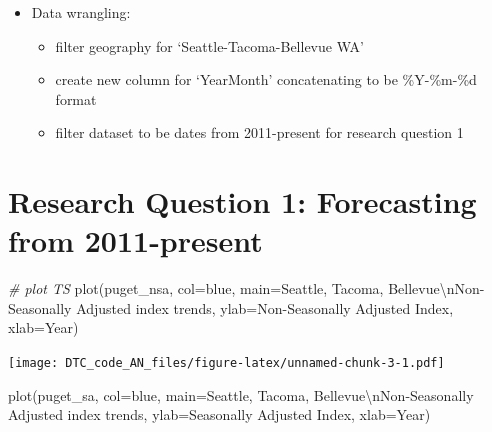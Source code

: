 \documentclass[
]{article}
\newenvironment{Shaded}{\begin{snugshade}}{\end{snugshade}}
\newcommand{\AttributeTok}[1]{\textcolor[rgb]{0.77,0.63,0.00}{#1}}
\newcommand{\CommentTok}[1]{\textcolor[rgb]{0.56,0.35,0.01}{\textit{#1}}}
\newcommand{\FunctionTok}[1]{\textcolor[rgb]{0.00,0.00,0.00}{#1}}
\newcommand{\NormalTok}[1]{#1}
\newcommand{\SpecialCharTok}[1]{\textcolor[rgb]{0.00,0.00,0.00}{#1}}
\newcommand{\StringTok}[1]{\textcolor[rgb]{0.31,0.60,0.02}{#1}}
\providecommand{\tightlist}{%
  \setlength{\itemsep}{0pt}\setlength{\parskip}{0pt}}
\begin{document}
\begin{itemize}
\item
  Data wrangling:

  \begin{itemize}
  \tightlist
  \item
    filter geography for `Seattle-Tacoma-Bellevue WA'
  \item
    create new column for `YearMonth' concatenating to be \%Y-\%m-\%d
    format
  \item
    filter dataset to be dates from 2011-present for research question 1
  \end{itemize}
\end{itemize}

\hypertarget{research-question-1-forecasting-from-2011-present}{%
\section{Research Question 1: Forecasting from
2011-present}\label{research-question-1-forecasting-from-2011-present}}

\begin{Shaded}
\begin{Highlighting}[]
\CommentTok{\# plot TS}
\FunctionTok{plot}\NormalTok{(puget\_nsa, }\AttributeTok{col=}\StringTok{\textquotesingle{}blue\textquotesingle{}}\NormalTok{, }\AttributeTok{main=}\StringTok{\textquotesingle{}Seattle, Tacoma, Bellevue}\SpecialCharTok{\textbackslash{}n}\StringTok{Non{-}Seasonally Adjusted index trends\textquotesingle{}}\NormalTok{, }\AttributeTok{ylab=}\StringTok{\textquotesingle{}Non{-}Seasonally Adjusted Index\textquotesingle{}}\NormalTok{, }\AttributeTok{xlab=}\StringTok{\textquotesingle{}Year\textquotesingle{}}\NormalTok{)}
\end{Highlighting}
\end{Shaded}

\texttt{[image: DTC\_code\_AN\_files/figure-latex/unnamed-chunk-3-1.pdf]}

\begin{Shaded}
\begin{Highlighting}[]
\FunctionTok{plot}\NormalTok{(puget\_sa, }\AttributeTok{col=}\StringTok{\textquotesingle{}blue\textquotesingle{}}\NormalTok{, }\AttributeTok{main=}\StringTok{\textquotesingle{}Seattle, Tacoma, Bellevue}\SpecialCharTok{\textbackslash{}n}\StringTok{Non{-}Seasonally Adjusted index trends\textquotesingle{}}\NormalTok{, }\AttributeTok{ylab=}\StringTok{\textquotesingle{}Seasonally Adjusted Index\textquotesingle{}}\NormalTok{, }\AttributeTok{xlab=}\StringTok{\textquotesingle{}Year\textquotesingle{}}\NormalTok{)}
\end{Highlighting}
\end{Shaded}
\end{document}
